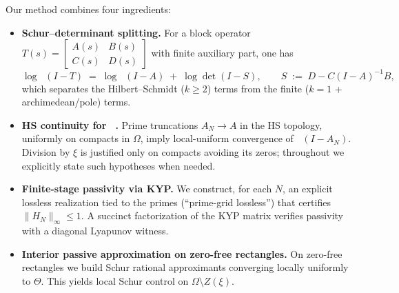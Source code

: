 \documentclass[11pt]{article}
\theoremstyle{definition}
\theoremstyle{remark}
\DeclareMathOperator{\dettwo}{det_2}
\begin{document}
Our method combines four ingredients:
\begin{itemize}
 \item \textbf{Schur--determinant splitting.} For a block operator \(T(s)=\begin{bmatrix}A(s)&B(s)\\ C(s)&D(s)\end{bmatrix}\) with finite auxiliary part, one has
 \[
  \log\dettwo(I-T)\;=\;\log\dettwo(I-A)\; +\; \log\det(I-S),\qquad S\;:=\;D-C(I-A)^{-1}B,
 \]
 which separates the Hilbert--Schmidt (\(k\ge 2\)) terms from the finite (\(k=1\) + archimedean/pole) terms.
 \item \textbf{HS continuity for \(\dettwo\).} Prime truncations \(A_N\to A\) in the HS topology, uniformly on compacts in \(\Omega\), imply local-uniform convergence of \(\dettwo(I-A_N)\). Division by \(\xi\) is justified only on compacts avoiding its zeros; throughout we explicitly state such hypotheses when needed.
 \item \textbf{Finite-stage passivity via KYP.} We construct, for each \(N\), an explicit lossless realization tied to the primes (``prime-grid lossless'') that certifies \(\|H_N\|_\infty\le 1\). A succinct factorization of the KYP matrix verifies passivity with a diagonal Lyapunov witness.
 \item \textbf{Interior passive approximation on zero-free rectangles.} On zero-free rectangles we build Schur rational approximants converging locally uniformly to \(\Theta\). This yields local Schur control on \(\Omega\setminus Z(\xi)\).
\end{itemize}
\end{document}
